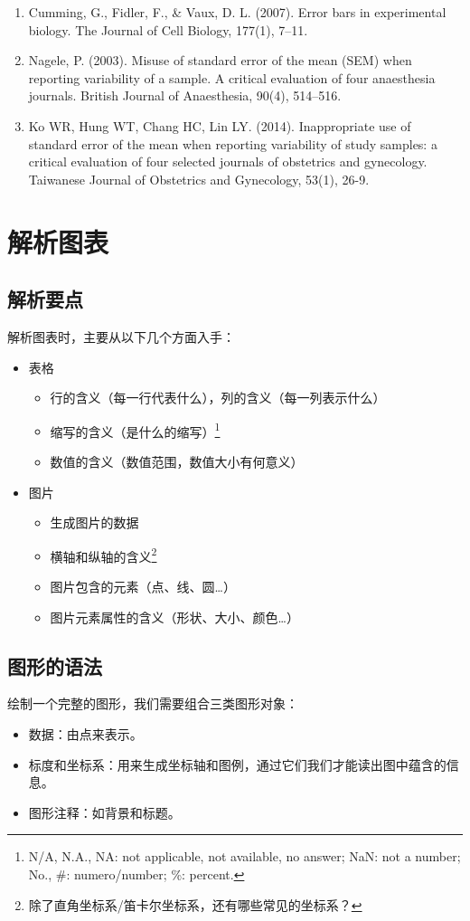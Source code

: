 \documentclass[11pt,a4paper,twoside]{book}
\begin{document}
{{\begin{enumerate}
  \item Cumming, G., Fidler, F., \& Vaux, D. L. (2007). Error bars in experimental biology. The Journal of Cell Biology, 177(1), 7–11.
  \item Nagele, P. (2003). Misuse of standard error of the mean (SEM) when reporting variability of a sample. A critical evaluation of four anaesthesia journals. British Journal of Anaesthesia, 90(4), 514–516.
  \item Ko WR, Hung WT, Chang HC, Lin LY. (2014). Inappropriate use of standard error of the mean when reporting variability of study samples: a critical evaluation of four selected journals of obstetrics and gynecology. Taiwanese Journal of Obstetrics and Gynecology, 53(1), 26-9.
\end{enumerate}
}}

\section{解析图表}
\subsection{解析要点}
解析图表时，主要从以下几个方面入手：
\begin{itemize}
  \item 表格
    \begin{itemize}
      \item 行的含义（每一行代表什么），列的含义（每一列表示什么）
      \item 缩写的含义（是什么的缩写）\footnote{N/A, N.A., NA: not applicable, not available, no answer; NaN: not a number; No., \#: numero/number; \%: percent.}
      \item 数值的含义（数值范围，数值大小有何意义）
    \end{itemize}
  \item 图片
    \begin{itemize}
      \item 生成图片的数据
      \item 横轴和纵轴的含义\footnote{除了直角坐标系/笛卡尔坐标系，还有哪些常见的坐标系？}
      \item 图片包含的元素（点、线、圆\ldots）
      \item 图片元素属性的含义（形状、大小、颜色\ldots）
    \end{itemize}
\end{itemize}

\subsection{图形的语法}
绘制一个完整的图形，我们需要组合三类图形对象：
\begin{itemize}
  \item 数据：由点来表示。
  \item 标度和坐标系：用来生成坐标轴和图例，通过它们我们才能读出图中蕴含的信息。
  \item 图形注释：如背景和标题。
\end{itemize}
\end{document}
